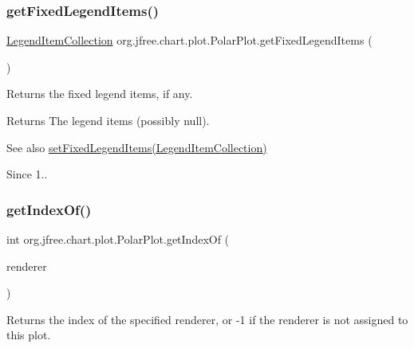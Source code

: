 \subsubsection{\texorpdfstring{get\+Fixed\+Legend\+Items()}{getFixedLegendItems()}}
{\footnotesize\ttfamily \mbox{\hyperlink{classorg_1_1jfree_1_1chart_1_1_legend_item_collection}{Legend\+Item\+Collection}} org.\+jfree.\+chart.\+plot.\+Polar\+Plot.\+get\+Fixed\+Legend\+Items (\begin{DoxyParamCaption}{ }\end{DoxyParamCaption})}

Returns the fixed legend items, if any.

\begin{DoxyReturn}{Returns}
The legend items (possibly {\ttfamily null}).
\end{DoxyReturn}
\begin{DoxySeeAlso}{See also}
\mbox{\hyperlink{classorg_1_1jfree_1_1chart_1_1plot_1_1_polar_plot_a6ed8b0a9982bf4d0cacd52fa8f1b57d0}{set\+Fixed\+Legend\+Items(\+Legend\+Item\+Collection)}}
\end{DoxySeeAlso}
\begin{DoxySince}{Since}
1.. 
\end{DoxySince}
\mbox{\label{classorg_1_1jfree_1_1chart_1_1plot_1_1_polar_plot_a906821dc15f43c7cbbed2bd3e91dcee7}} 
\subsubsection{\texorpdfstring{get\+Index\+Of()}{getIndexOf()}}
{\footnotesize\ttfamily int org.\+jfree.\+chart.\+plot.\+Polar\+Plot.\+get\+Index\+Of (\begin{DoxyParamCaption}\item[{\mbox{\hyperlink{interfaceorg_1_1jfree_1_1chart_1_1renderer_1_1_polar_item_renderer}{Polar\+Item\+Renderer}}}]{renderer }\end{DoxyParamCaption})}

Returns the index of the specified renderer, or {\ttfamily -\/1} if the renderer is not assigned to this plot.


